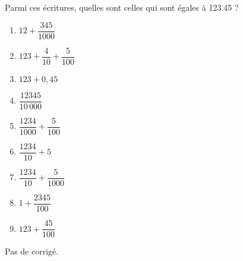 \begin{exercice*}
    Parmi ces écritures, quelles sont celles qui sont égales à \num{123.45} ? \smallskip
    \begin{multicols}{2}
      \begin{enumerate}
         \item $12+\dfrac{345}{\num{1 000}}$ \smallskip
         \item \small$123+\dfrac{4}{10}+\dfrac{5}{100}$ \smallskip
         \item $123+0,45$ \smallskip
         \item $\dfrac{\num{12 345}}{10\,000}$ \smallskip
         \item $\dfrac{\num{1 234}}{\num{1 000}}+\dfrac{5}{100}$ \smallskip 
         \item $\dfrac{\num{1 234}}{10}+5$ \smallskip
         \item $\dfrac{\num{1 234}}{10}+\dfrac{5}{\num{1 000}}$ \smallskip
         \item $1+\dfrac{\num{2 345}}{100}$ \smallskip
         \item $123+\dfrac{45}{100}$
      \end{enumerate}
   \end{multicols}
 \end{exercice*}
\begin{corrige}
  Pas de corrigé.
\end{corrige}